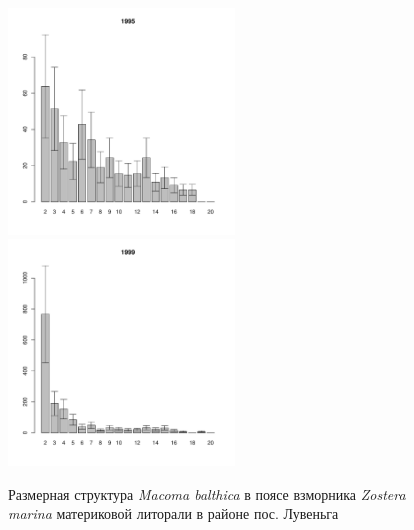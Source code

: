 \documentclass[12pt, a4paper]{article}
\begin{document}
\begin{figure}[h]
\begin{multicols}{3}
\hfill
\includegraphics[width=60mm]{../White_Sea/Luvenga_II_razrez/zostera_zone2_1995_.pdf}
\hfill
\includegraphics[width=60mm]{../White_Sea/Luvenga_II_razrez/zostera_zone2_1999_.pdf}

\end{multicols}


\caption{Размерная структура {\it Macoma balthica} в поясе взморника {\it Zostera marina} материковой литорали в районе пос. Лувеньга}
\label{ris:size_str_2razrez_zostera}
\end{figure}
\end{document}
